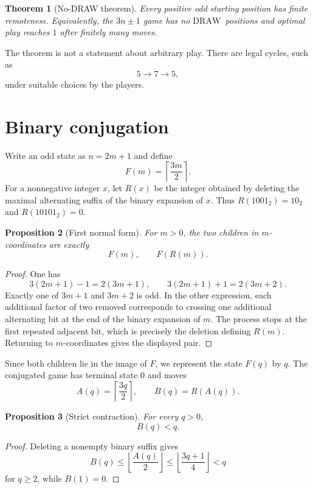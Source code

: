 \documentclass[11pt]{article}
\newtheorem{theorem}{Theorem}[section]
\newtheorem{proposition}[theorem]{Proposition}
\newcommand{\DRAW}{\ensuremath{\mathrm{DRAW}}}
\begin{document}
\begin{theorem}[No-DRAW theorem]\label{thm:main}
Every positive odd starting position has finite remoteness. Equivalently, the
$3n\pm1$ game has no \DRAW\ positions and optimal play reaches $1$ after
finitely many moves.
\end{theorem}

The theorem is not a statement about arbitrary play. There are legal cycles,
such as
\[
  5\longrightarrow 7\longrightarrow 5,
\]
under suitable choices by the players.

\section{Binary conjugation}

Write an odd state as $n=2m+1$ and define
\[
  F(m)=\left\lceil\frac{3m}{2}\right\rceil .
\]
For a nonnegative integer $x$, let $R(x)$ be the integer obtained by deleting
the maximal alternating suffix of the binary expansion of $x$. Thus
$R(1001_2)=10_2$ and $R(10101_2)=0$.

\begin{proposition}[First normal form]\label{prop:first-normal}
For $m>0$, the two children in $m$-coordinates are exactly
\[
  F(m),\qquad F(R(m)).
\]
\end{proposition}

\begin{proof}
One has
\[
  3(2m+1)-1=2(3m+1),\qquad
  3(2m+1)+1=2(3m+2).
\]
Exactly one of $3m+1$ and $3m+2$ is odd. In the other expression, each
additional factor of two removed corresponds to crossing one additional
alternating bit at the end of the binary expansion of $m$. The process stops
at the first repeated adjacent bit, which is precisely the deletion defining
$R(m)$. Returning to $m$-coordinates gives the displayed pair.
\end{proof}

Since both children lie in the image of $F$, we represent the state $F(q)$ by
$q$. The conjugated game has terminal state $0$ and moves
\[
  A(q)=\left\lceil\frac{3q}{2}\right\rceil,
  \qquad
  B(q)=R(A(q)).
\]

\begin{proposition}[Strict contraction]\label{prop:B-contracts}
For every $q>0$,
\[
  B(q)<q.
\]
\end{proposition}

\begin{proof}
Deleting a nonempty binary suffix gives
\[
  B(q)\le \left\lfloor\frac{A(q)}2\right\rfloor
       \le \left\lfloor\frac{3q+1}{4}\right\rfloor<q
\]
for $q\ge2$, while $B(1)=0$.
\end{proof}
\end{document}
